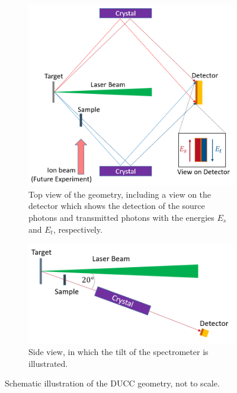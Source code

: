 \begin{figure} [H]
	\centering
	\begin{subfigure}[t]{0.48\textwidth}
		\includegraphics[width=\textwidth]{Diagrams/DUCCRealSchematic.PNG}
		\caption{Top view of the geometry, including a view on the detector which shows the detection of the source photons and transmitted photons with the energies $E_s$ and $E_t$, respectively.}
		\label{realDUCCSchematicTop}
	\end{subfigure}%
	\hfill
	\begin{subfigure}[t]{0.5\textwidth}
		\centering
		\includegraphics[width=\textwidth]{Diagrams/DUCCRealSchematicSide.PNG}
		\caption{Side view, in which the tilt of the 
			spectrometer is 
			illustrated.}
		\label{realDUCCSchematicSide}
	\end{subfigure}
	\caption{Schematic illustration of the DUCC geometry, not to 
		scale.}
	\label{realDUCCSchematic}
\end{figure}

